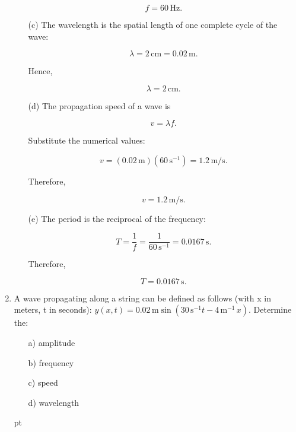 \documentclass[t,aspectratio=169]{beamer}
\begin{document}
\begin{frame}
\begin{enumerate}
\begin{enumerate}
$$\boxed{f=60\,\mathrm{Hz}}.$$

\pagebreak
\item[(c)] The wavelength is the spatial length of one complete cycle of the wave:

$$\lambda=2\,\mathrm{cm}=0.02\,\mathrm{m}.$$

Hence,

$$\boxed{\lambda=2\,\mathrm{cm}}.$$

\item[(d)] The propagation speed of a wave is

$$v=\lambda f.$$

Substitute the numerical values:

$$v=(0.02\,\mathrm{m})(60\,\mathrm{s^{-1}})=1.2\,\mathrm{m/s}.$$

\pagebreak
Therefore,

$$\boxed{v=1.2\,\mathrm{m/s}}.$$

\item[(e)] The period is the reciprocal of the frequency:

$$T=\frac{1}{f}=\frac{1}{60\,\mathrm{s^{-1}}}=0.0167\,\mathrm{s}.$$

Therefore,

$$\boxed{T=0.0167\,\mathrm{s}}.$$

\end{enumerate}


\pagebreak

\item A wave propagating along a string can be defined as follows (with x in meters, t in seconds): $y(x,t)=0.02\,\mathrm{m}\sin(30\,\mathrm{s^{-1}}t-4\,\mathrm{m^{-1}}\,x).$ Determine the:
\begin{enumerate}
\item[a)] amplitude
\item[b)] frequency
\item[c)] speed
\item[d)] wavelength
\end{enumerate}

\begin{center}
 pt
\end{center}
\end{enumerate}
\end{frame}
\end{document}
